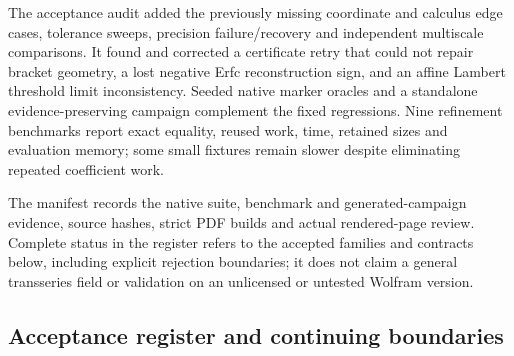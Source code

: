 \documentclass[11pt,a4paper]{article}
\begin{document}
The acceptance audit added the previously missing coordinate and calculus
edge cases, tolerance sweeps, precision failure/recovery and independent
multiscale comparisons. It found and corrected a certificate retry that
could not repair bracket geometry, a lost negative Erfc reconstruction
sign, and an affine Lambert threshold limit inconsistency. Seeded native
marker oracles and a standalone evidence-preserving campaign complement
the fixed regressions. Nine refinement benchmarks report exact equality,
reused work, time, retained sizes and evaluation memory; some small
fixtures remain slower despite eliminating repeated coefficient work.

The manifest  records the
native suite, benchmark and generated-campaign evidence, source hashes,
strict PDF builds and actual rendered-page review. Complete status in the
register refers to the accepted families and contracts below, including
explicit rejection boundaries; it does not claim a general transseries
field or validation on an unlicensed or untested Wolfram version.

\subsection{Acceptance register and continuing boundaries}
\end{document}
